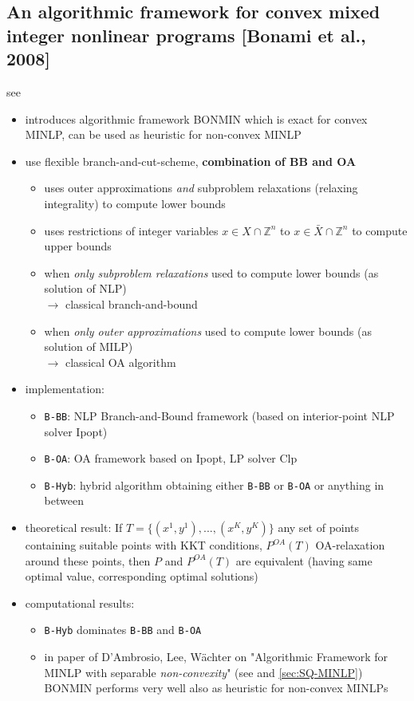 \documentclass{article}
\begin{document}
\subsection{An algorithmic framework for convex mixed integer nonlinear programs [Bonami et al., 2008]}
see \cite{bonami2008algorithmic}
\begin{itemize}
\item introduces algorithmic framework BONMIN which is exact for convex MINLP, can be used as heuristic for non-convex MINLP
\item use flexible branch-and-cut-scheme, \textbf{combination of BB and OA}
	\begin{itemize}
	\item uses outer approximations \textit{and} subproblem relaxations (relaxing integrality) to compute lower bounds
	\item uses restrictions of integer variables $x\in X \cap \mathbb{Z}^n$ to $x\in \bar{X} \cap \mathbb{Z}^n$ to compute upper bounds
	\item when \emph{only subproblem relaxations} used to compute lower bounds (as solution of NLP) \\
	$\rightarrow$ classical branch-and-bound
	\item when \textit{only outer approximations} used to compute lower bounds (as solution of MILP) \\
	$\rightarrow$ classical OA algorithm
	\end{itemize}
\item implementation:
	\begin{itemize}
	\item \texttt{B-BB}: NLP Branch-and-Bound framework (based on interior-point NLP solver Ipopt)
	\item \texttt{B-OA}: OA framework based on Ipopt, LP solver Clp
	\item \texttt{B-Hyb}: hybrid algorithm obtaining either \texttt{B-BB} or \texttt{B-OA} or anything in between
	\end{itemize}
\item theoretical result: If $T=\{(x^1,y^1), ... ,(x^K,y^K)\}$ any set of points containing suitable points with KKT conditions, $P^{OA}(T)$ OA-relaxation around these points, then $P$ and $P^{OA}(T)$ are equivalent (having same optimal value, corresponding optimal solutions)
\item computational results:
	\begin{itemize}
	\item  \texttt{B-Hyb} dominates \texttt{B-BB} and \texttt{B-OA}
	\item in paper of D'Ambrosio, Lee, W\"achter on "Algorithmic Framework for MINLP with separable \emph{non-convexity}" (see \cite{d2012algorithmic} and \ref{sec:SQ-MINLP}) BONMIN performs very well also as heuristic for non-convex MINLPs
	\end{itemize}
\end{itemize}
\end{document}
